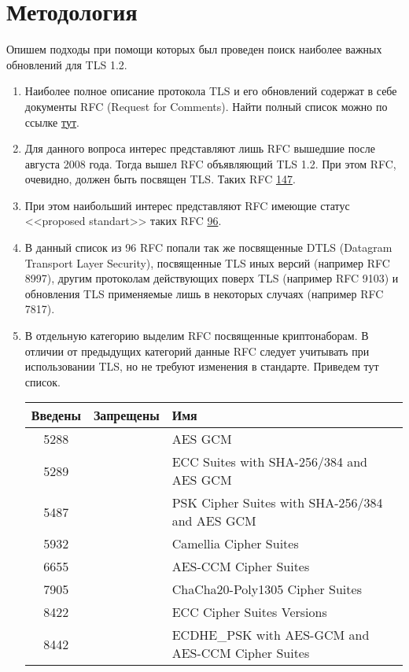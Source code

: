 \section{Методология}

Опишем подходы при помощи которых был проведен поиск наиболее важных обновлений для TLS 1.2.

\begin{enumerate}
	\item Наиболее полное описание протокола TLS и его обновлений содержат в себе документы RFC (Request for Comments). Найти полный список можно по ссылке \href{https://www.rfc-editor.org/search/rfc\_search\_detail.php?page=All\&pubstatus[]=Any\&pub\_date\_type=any\&sortkey=Number\&sorting=ASC}{тут}.
	
	\item Для данного вопроса интерес представляют лишь RFC вышедшие после августа 2008 года. Тогда вышел RFC объявляющий TLS 1.2. При этом RFC, очевидно, должен быть посвящен TLS. Таких RFC \href{https://www.rfc-editor.org/search/rfc\_search\_detail.php?page=All\&title=TLS\&pubstatus[]=Any\&from\_month=August\&from\_year=2008\&pub\_date\_type=range\&to\_month=December\&to\_year=2022\&sortkey=Number\&sorting=ASC}{147}. 
	
	\item При этом наибольший интерес представляют RFC имеющие статус <<proposed standart>> таких RFC \href{https://www.rfc-editor.org/search/rfc\_search\_detail.php?page=All\&title=TLS\&pubstatus[]=Standards\%20Track\&std\_trk=Proposed\%20Standard\&from\_month=August\&from\_year=2008\&pub\_date\_type=range\&to\_month=December\&to\_year=2022\&sortkey=Number\&sorting=ASC}{96}.
	
	\item В данный список из 96 RFC попали так же посвященные DTLS (Datagram Transport Layer Security), посвященные TLS иных версий (например RFC 8997), другим протоколам действующих поверх TLS (например RFC 9103) и обновления TLS применяемые лишь в некоторых случаях (например RFC 7817).
	
	\item В отдельную категорию выделим RFC посвященные криптонаборам. В отличии от предыдущих категорий данные RFC следует учитывать при использовании TLS, но не требуют изменения в стандарте. Приведем тут список.
	
	\begin{tabular}{|c|c|l|}
		\hline 
		\textbf{Введены} & \textbf{Запрещены} & \textbf{Имя}\\
		\hline 
		5288 & & AES GCM \\
		5289 & & ECC Suites with SHA-256/384 and AES GCM\\
		5487 & & PSK Cipher Suites with SHA-256/384 and AES GCM\\
		5932 & & Camellia Cipher Suites\\
		6655 & & AES-CCM Cipher Suites\\
		7905 & & ChaCha20-Poly1305 Cipher Suites\\
		8422 & & ECC Cipher Suites Versions\\
		8442 & & ECDHE\_PSK with AES-GCM and AES-CCM Cipher Suites\\
		

\end{tabular}
\end{enumerate}
